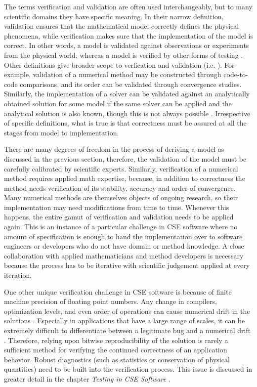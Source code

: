 The terms verification and validation are often used interchangeably,
but to many scientific domains they have specific meaning.   
In their narrow definition, validation ensures that the mathematical
model correctly defines the physical phenomena, while verification
makes sure that the implementation of the model is correct. In other
words, a model is validated against observations or experiments from
the physical world, whereas a model is verified by other forms of
testing \cite{oberkampf2002verification}.   Other definitions give
broader scope to  verfication and validation (i.e. \cite{sargent1998verification}). For
example, validation of a numerical method may be constructed through
code-to-code comparisons, and its order can be validated through
convergence studies. Similarly, the implementation of a solver can be
validated against an analytically obtained solution for some model if
the same solver can be applied and the analytical solution is also
known, though this is not always possible
\cite{oberkampf2010verification}.  Irrespective of  specific
definitions, what is true is that   correctness must be assured at all
the stages from model to implementation.     

There are many degrees of freedom in the process of deriving a
model as discussed in the previous section, therefore, the validation of the
model must be carefully calibrated by scientific experts. Similarly,
verification of a numerical method requires applied math expertise,
because, in addition to correctness the method needs verification of its stability, accuracy and
order of convergence. Many numerical methods 
are themselves objects of ongoing research, so their
implementation may need modifications from time to time. Whenever
this happens, the entire gamut of verification and validation needs to
be applied again. This is an instance of a particular challenge in 
CSE software where no amount of specification is enough to hand the
implementation over to software engineers or developers who do not
have domain or method knowledge. A close collaboration with applied
mathematicians and method developers is necessary because the process
has to be iterative with scientific judgement applied at every
iteration.  

One other unique verification challenge in CSE software is because of
finite machine precision of floating point numbers. Any change in
compilers, optimization levels, and even order of operations can cause
numerical drift in the solutions
\cite{monniaux2008pitfalls}. Especially in applications that have a
large range of scales, it can be extremely difficult to differentiate
between a legitimate bug and a numerical drift \cite{Dubey2015}. Therefore, relying
upon bitwise reproducibility of the solution is rarely a sufficient
method for verifying the continued correctness of an application
behavior. Robust diagnostics (such as statistics or conservation of
physical quantities) need to be built into the verification process.
This issue is discussed in greater detail in the chapter {\em Testing
  in CSE Software} .  

